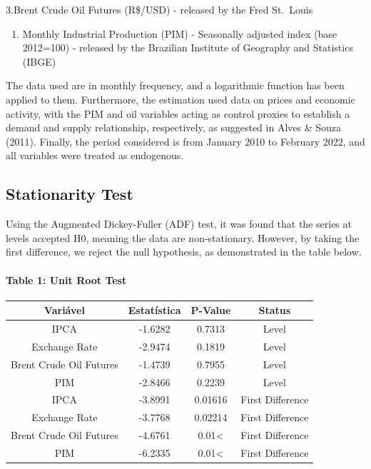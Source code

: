 \documentclass[12pt]{article}
\providecommand{\tightlist}{%
  \setlength{\itemsep}{0pt}\setlength{\parskip}{0pt}}
\begin{document}
3.Brent Crude Oil Futures (R\$/USD) - released by the Fred St.~Louis

\begin{enumerate}
\def\labelenumi{\arabic{enumi}.}
\setcounter{enumi}{3}
\tightlist
\item
  Monthly Industrial Production (PIM) - Seasonally adjusted index (base
  2012=100) - released by the Brazilian Institute of Geography and
  Statistics (IBGE)
\end{enumerate}

The data used are in monthly frequency, and a logarithmic function has
been applied to them. Furthermore, the estimation used data on prices
and economic activity, with the PIM and oil variables acting as control
proxies to establish a demand and supply relationship, respectively, as
suggested in Alves \& Souza (2011). Finally, the period considered is
from January 2010 to February 2022, and all variables were treated as
endogenous.

\hypertarget{stationarity-test}{%
\subsection{Stationarity Test}\label{stationarity-test}}

Using the Augmented Dickey-Fuller (ADF) test, it was found that the
series at levels accepted H0, meaning the data are non-stationary.
However, by taking the first difference, we reject the null hypothesis,
as demonstrated in the table below.

\hypertarget{table-1-unit-root-test}{%
\paragraph{Table 1: Unit Root Test}\label{table-1-unit-root-test}}

\begin{longtable}[]{@{}cccc@{}}
\toprule\noalign{}
Variável & Estatística & P-Value & Status \\
\midrule\noalign{}
\endhead
\bottomrule\noalign{}
\endlastfoot
IPCA & -1.6282 & 0.7313 & Level \\
Exchange Rate & -2.9474 & 0.1819 & Level \\
Brent Crude Oil Futures & -1.4739 & 0.7955 & Level \\
PIM & -2.8466 & 0.2239 & Level \\
IPCA & -3.8991 & 0.01616 & First Difference \\
Exchange Rate & -3.7768 & 0.02214 & First Difference \\
Brent Crude Oil Futures & -4.6761 & 0.01\textless{} & First
Difference \\
PIM & -6.2335 & 0.01\textless{} & First Difference \\
\end{longtable}
\end{document}
